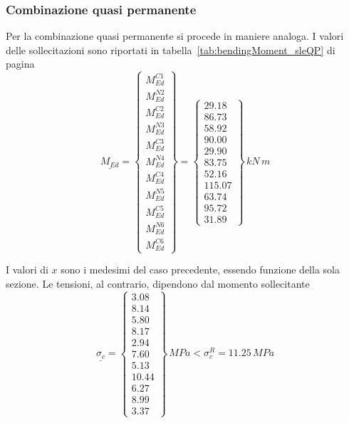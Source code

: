 \subsubsection*{Combinazione quasi permanente}
Per la combinazione quasi permanente  si procede in maniere analoga. I valori delle sollecitazioni sono riportati in tabella~\ref{tab:bendingMoment_sleQP} di pagina \pageref{tab:bendingMoment_sleQP}
\[
\underline{M_{Ed}} = 
\begin{Bmatrix}
	M_{Ed}^{C1}\\
	M_{Ed}^{N2}\\
	M_{Ed}^{C2}\\
	M_{Ed}^{N3}\\
	M_{Ed}^{C3}\\
	M_{Ed}^{N4}\\
	M_{Ed}^{C4}\\
	M_{Ed}^{N5}\\
	M_{Ed}^{C5}\\
	M_{Ed}^{N6}\\
	M_{Ed}^{C6}
\end{Bmatrix} = 
\begin{Bmatrix}
	29.18\\
	86.73\\
	58.92\\
	90.00\\
	29.90\\
	83.75\\
	52.16\\
	115.07\\
	63.74\\
	95.72\\
	31.89
\end{Bmatrix}\,kN\,m
\]

I valori di $x$ sono i medesimi del caso precedente, essendo funzione della sola sezione. Le tensioni, al contrario, dipendono dal momento sollecitante
\[
\underline{\sigma_c} = 
\begin{Bmatrix}
	3.08\\
	8.14\\
	5.80\\
	8.17\\
	2.94\\
	7.60\\
	5.13\\
	10.44\\
	6.27\\
	8.99\\
	3.37
\end{Bmatrix}\,MPa < \sigma_c^R = 11.25\,MPa
\]

